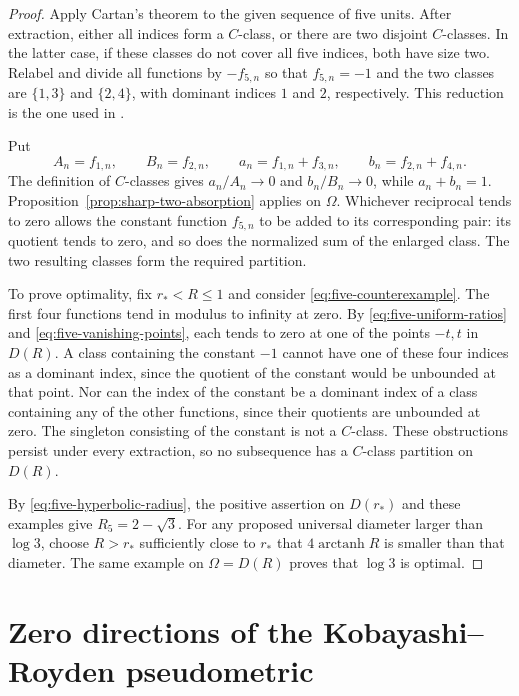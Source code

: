 \documentclass[12pt,letterpaper,reqno]{amsart}
\theoremstyle{definition}
\numberwithin{equation}{section}
\begin{document}
	\begin{proof}
		Apply Cartan's theorem to the given sequence of five units.
		After extraction, either all indices form a $C$-class, or there are
		two disjoint $C$-classes. In the latter case, if these classes do not
		cover all five indices, both have size two. Relabel and divide all
		functions by $-f_{5,n}$ so that $f_{5,n}=-1$ and the two classes are
		$\{1,3\}$ and $\{2,4\}$, with dominant indices $1$ and $2$, respectively.
		This reduction is the one used in
		\cite{Ere96b}.
		
		Put
		\[
		A_n=f_{1,n},\qquad B_n=f_{2,n},\qquad
		a_n=f_{1,n}+f_{3,n},\qquad b_n=f_{2,n}+f_{4,n}.
		\]
		The definition of $C$-classes gives $a_n/A_n\to0$ and $b_n/B_n\to0$, while
		$a_n+b_n=1$. Proposition~\ref{prop:sharp-two-absorption} applies on
		$\Omega$. Whichever reciprocal tends to zero allows the 
		constant function $f_{5,n}$
		to be added to its corresponding pair: its quotient tends
		to zero, and so does the normalized sum of the enlarged class.
		The two resulting classes form the required partition.
		
		To prove optimality, fix $r_*<R\le1$ and consider
		\eqref{eq:five-counterexample}. The first four functions tend in
		modulus to infinity at zero. By
		\eqref{eq:five-uniform-ratios} and
		\eqref{eq:five-vanishing-points}, each tends to zero at one of the
		points $-t,t$ in $D(R)$. A class containing the constant $-1$ cannot
		have one of these four indices as a dominant index, since the
		quotient of the constant would be unbounded at that point. Nor can
		the index of the constant be a dominant index of a class containing any of the other
		functions, since their quotients are unbounded at zero. The
		singleton consisting of the constant is not a $C$-class. These
		obstructions persist under every extraction, so no subsequence has
		a $C$-class partition on $D(R)$.
		
		By \eqref{eq:five-hyperbolic-radius}, the positive assertion on
		$D(r_*)$ and these examples give $R_5=2-\sqrt3$. For any proposed
		universal diameter larger than $\log3$, choose $R>r_*$ sufficiently
		close to $r_*$ that $4\operatorname{arctanh}R$ is smaller than that
		diameter. The same example on $\Omega=D(R)$ proves that $\log3$
		is optimal.
	\end{proof}
	
	\section{Zero directions of the Kobayashi--Royden pseudometric}
	\label{sec:geometry}
	
\end{document}
